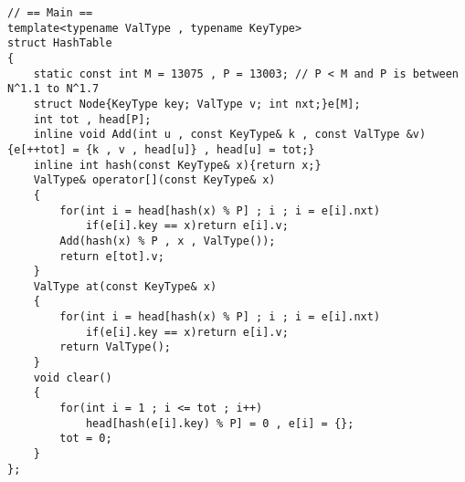 \begin{verbatim}
// == Main ==
template<typename ValType , typename KeyType>
struct HashTable
{
    static const int M = 13075 , P = 13003; // P < M and P is between N^1.1 to N^1.7
    struct Node{KeyType key; ValType v; int nxt;}e[M];
    int tot , head[P];
    inline void Add(int u , const KeyType& k , const ValType &v){e[++tot] = {k , v , head[u]} , head[u] = tot;}
    inline int hash(const KeyType& x){return x;}
    ValType& operator[](const KeyType& x)
    {
        for(int i = head[hash(x) % P] ; i ; i = e[i].nxt)
            if(e[i].key == x)return e[i].v;
        Add(hash(x) % P , x , ValType());
        return e[tot].v;
    }
    ValType at(const KeyType& x)
    {
        for(int i = head[hash(x) % P] ; i ; i = e[i].nxt)
            if(e[i].key == x)return e[i].v;
        return ValType();
    }
    void clear()
    {
        for(int i = 1 ; i <= tot ; i++)
            head[hash(e[i].key) % P] = 0 , e[i] = {};
        tot = 0;
    }
};
\end{verbatim}